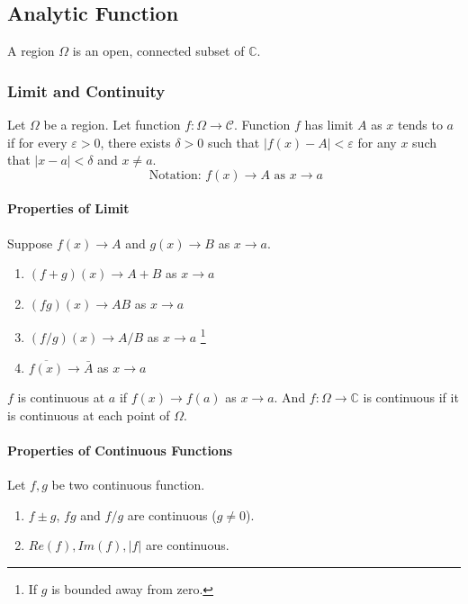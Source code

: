 \subsection{Analytic Function}
\begin{definition}[region]
	A region $\Omega$ is an open, connected subset of $\mathbb{C}$.
\end{definition}

\subsubsection{Limit and Continuity}
\begin{definition}[limit]
	Let $\Omega$ be a region.
	Let function $f : \Omega \to \mathcal{C}$.
	Function $f$ has limit $A$ as $x$ tends to $a$ if for every $\varepsilon > 0$, there exists $\delta > 0$ such that $|f(x)-A| < \varepsilon$ for any $x$ such that $|x-a| < \delta$ and $x \ne a$.
	\[ \text{ Notation: } f(x) \to A \text{ as } x \to a \]
\end{definition}

\paragraph{Properties of Limit}
Suppose $f(x) \to A$ and $g(x) \to B$ as $x \to a$.
\begin{enumerate}
	\item $(f+g)(x) \to A+B$ as $x \to a$
	\item $(fg)(x) \to AB$ as $x \to a$
	\item $(f/g)(x) \to A/B$ as $x \to a$ \dag\footnote{If $g$ is bounded away from zero.}
	\item $\overline{f(x)} \to \bar{A}$ as $x \to a$
\end{enumerate}

\begin{definition}[continuity]
	$f$ is continuous at $a$ if $f(x) \to f(a)$ as $x \to a$.
	And $f : \Omega \to \mathbb{C}$ is continuous if it is continuous at each point of $\Omega$.
\end{definition}

\paragraph{Properties of Continuous Functions}
Let $f,g$ be two continuous function.
\begin{enumerate}
	\item $f \pm g$, $fg$ and $f/g$ are continuous ($g \ne 0$).
	\item $Re{(f)}, Im{(f)}, |f|$ are continuous.
\end{enumerate}

